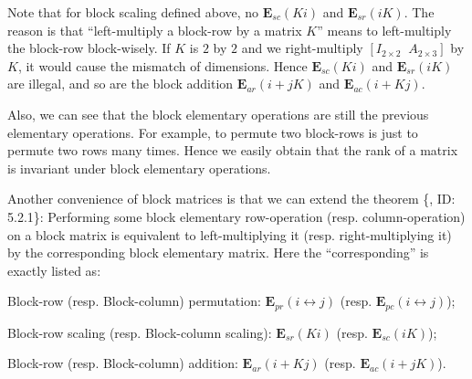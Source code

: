 \documentclass{article}
\begin{document}
\begin{Rmk}{}
    Note that for block scaling defined above, no $\pmb{E}_{sc}(Ki)$ and $\pmb{E}_{sr}(iK)$. The reason is that ``left-multiply a block-row by a matrix $K$'' means to left-multiply the block-row block-wisely. If $K$ is $2$ by $2$ and we right-multiply $[I_{2\times 2}\;\; A_{2\times 3}]$ by $K$, it would cause the mismatch of dimensions. Hence $\pmb{E}_{sc}(Ki)$ and $\pmb{E}_{sr}(iK)$ are illegal, and so are the block addition $\pmb{E}_{ar}(i+jK)$ and $\pmb{E}_{ac}(i+Kj)$.

    Also, we can see that the block elementary operations are still the previous elementary operations. For example, to permute two block-rows is just to permute two rows many times. Hence we easily obtain that \textcolor{Th}{the rank of a matrix is invariant under block elementary operations}.

    Another convenience of block matrices is that we can extend the theorem \{, ID: 5.2.1\}: \textcolor{Th}{Performing some block elementary row-operation (resp. column-operation) on a block matrix is equivalent to left-multiplying it (resp. right-multiplying it) by the corresponding block elementary matrix.} Here the ``corresponding'' is exactly listed as:
    \begin{compactenum}
        \item Block-row (resp. Block-column) permutation: $\pmb{E}_{pr}(i\leftrightarrow j)$ (resp. $\pmb{E}_{pc}(i\leftrightarrow j)$);
        \item Block-row scaling (resp. Block-column scaling): $\pmb{E}_{sr}(Ki)$ (resp. $\pmb{E}_{sc}(iK)$);
        \item Block-row (resp. Block-column) addition: $\pmb{E}_{ar}(i+Kj)$ (resp. $\pmb{E}_{ac}(i+jK)$).
    \end{compactenum}
\end{Rmk}
\end{document}
